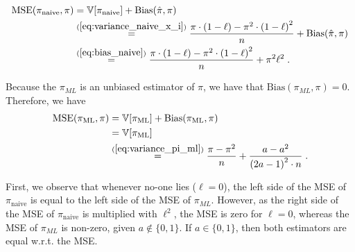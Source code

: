 \documentclass{article}
\newcommand{\stepandtag}{%
  \refstepcounter{equation}%
  \tag{\theequation}%
}
\newcommand{\piml}{\ensuremath{\pi_{ML}}}
\begin{document}
\begin{align*}
    \text{MSE}(\pi_{\text{naive}}, \pi) &= \mathbb{V}[\pi_{\text{naive}}] + \text{Bias}(\hat{\pi}, \pi) \\
    &\overset{(\ref{eq:variance_naive_x_i})}{=} \frac{\pi \cdot (1-\ell) - \pi^2 \cdot {(1-\ell)}^2}{n} + \text{Bias}(\hat{\pi}, \pi) \\
    &\overset{(\ref{eq:bias_naive})}{=} \frac{\pi \cdot (1-\ell) - \pi^2 \cdot {(1-\ell)}^2}{n} + \pi^2 \ell^2
    \;.
\end{align*}

Because the $\piml$ is an unbiased estimator of $\pi$, we have that $\text{Bias}(\piml, \pi) = 0$.
Therefore, we have
\begin{align*}
    \text{MSE}(\pi_{\text{ML}}, \pi) &= \mathbb{V}[\pi_{\text{ML}}] + \text{Bias}(\pi_{\text{ML}}, \pi) \\
    &= \mathbb{V}[\pi_{\text{ML}}] \\
    &\overset{(\ref{eq:variance_pi_ml})}{=} \frac{\pi - \pi^2}{n} + \frac{a - a^2}{{(2a-1)}^2 \cdot n}\;.
\end{align*}

First, we observe that whenever no-one lies ($\ell = 0$), the left side of the MSE of $\pi_{\text{naive}}$ is equal to the left side of the MSE of $\piml$. However, as the right side of the MSE of $\pi_{\text{naive}}$ is multiplied with $\ell^2$, the MSE is zero for $\ell = 0$, whereas the MSE of $\piml$ is non-zero, given $a\notin \{0, 1\}$. If $a\in \{0, 1\}$, then both estimators are equal w.r.t. the MSE.


\end{document}
